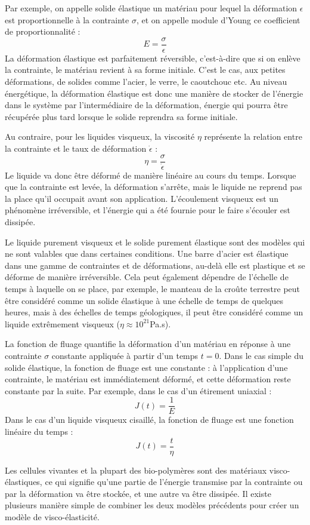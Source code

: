 \documentclass{report}
\begin{document}
Par exemple, on appelle solide élastique un matériau pour lequel la déformation $\epsilon$ est proportionnelle à la contrainte $ \sigma$, et on appelle module d'Young ce coefficient de proportionnalité : 
$$ E = \frac{\sigma}{\epsilon}$$
La déformation élastique est parfaitement réversible, c'est-à-dire que si on enlève la contrainte, le matériau revient à sa forme initiale. C'est le cas, aux petites déformations, de solides comme l'acier, le verre, le caoutchouc etc. Au niveau énergétique, la déformation élastique est donc une manière de stocker de l'énergie dans le système par l'intermédiaire de la déformation, énergie qui pourra être récupérée plus tard lorsque le solide reprendra sa forme initiale. 

Au contraire, pour les liquides visqueux, la viscosité $\eta$ représente la relation entre la contrainte et le taux de déformation $\dot{\epsilon}$ : 
$$ \eta=\frac{\sigma}{\dot{\epsilon}}$$
Le liquide va donc être déformé de manière linéaire au cours du temps. Lorsque que la contrainte est levée, la déformation s'arrête, mais le liquide ne reprend pas la place qu'il occupait avant son application. 
L'écoulement visqueux est un phénomène irréversible, et l'énergie qui a été fournie pour le faire s'écouler est dissipée. 

Le liquide purement visqueux et le solide purement élastique sont des modèles qui ne sont valables que dans certaines conditions. Une barre d'acier est élastique dans une gamme de contraintes et de déformations, au-delà elle est plastique et se déforme de manière irréversible. Cela peut également dépendre de l'échelle de temps à laquelle on se place, par exemple, le manteau de la croûte terrestre peut être considéré comme un solide élastique à une échelle de temps de quelques heures, mais à des échelles de temps géologiques, il peut être considéré comme un liquide extrêmement visqueux ($\eta \approx 10^{21}$Pa.s). 


La fonction de fluage quantifie la déformation d'un matériau en réponse à une contrainte $\sigma$ constante appliquée à partir d'un temps $t=0$. 
Dans le cas simple du solide élastique, la fonction de fluage est une constante : à l'application d'une contrainte, le matériau est immédiatement déformé, et cette déformation reste constante par la suite. Par exemple, dans le cas d'un étirement uniaxial : 
$$J(t)=\frac{1}{E}$$
Dans le cas d'un liquide visqueux cisaillé, la fonction de fluage est une fonction linéaire du temps : 
$$ J(t)=\frac{t}{\eta}$$

Les cellules vivantes et la plupart des bio-polymères sont des matériaux visco-élastiques, ce qui signifie qu'une partie de l'énergie transmise par la contrainte ou par la déformation va être stockée, et une autre va être dissipée. Il existe plusieurs manière simple de combiner les deux modèles précédents pour créer un modèle de visco-élasticité. 
\end{document}
